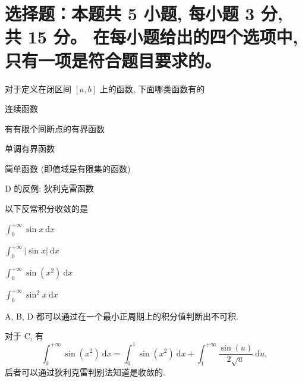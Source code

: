 \fi




\section{%
  选择题：本题共 5 小题, 每小题 3 分, 共 15 分。
  在每小题给出的四个选项中, 只有一项是符合题目要求的。
}


\begin{question}
对于定义在闭区间 $[a, b]$ 上的函数, 下面哪类函数有的 \paren[D]

\begin{choices}
\item 连续函数
\item 有有限个间断点的有界函数
\item 单调有界函数
\item 简单函数 (即值域是有限集的函数)
\end{choices}
\end{question}

\begin{solution}
D 的反例: 狄利克雷函数
\end{solution}

\begin{question}
以下反常积分收敛的是 \paren[C]

\begin{choices}
\item $\displaystyle \int_0^{+\infty} \sin x ~ \mathrm{d} x$
\item $\displaystyle \int_0^{+\infty} |\sin x| ~ \mathrm{d} x$
\item $\displaystyle \int_0^{+\infty} \sin (x^2) ~ \mathrm{d} x$
\item $\displaystyle \int_0^{+\infty} \sin^2 x ~ \mathrm{d} x$
\end{choices}
\end{question}

\begin{solution}
A, B, D 都可以通过在一个最小正周期上的积分值判断出不可积.

对于 C, 有
$$\int_0^{+\infty} \sin (x^2) ~ \mathrm{d} x = \int_0^1 \sin (x^2) ~ \mathrm{d} x + \int_1^{+\infty} \dfrac{\sin (u)}{2\sqrt{u}} ~ \mathrm{d} u,$$
后者可以通过狄利克雷判别法知道是收敛的.
\end{solution}

